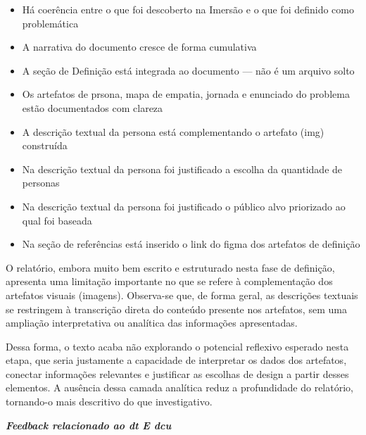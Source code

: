 \documentclass[
  sigconf,
  nonacm, %
  language=portuguese
]{acmart}
\begin{document}
\begin{itemize}[leftmargin=14pt,itemsep=1pt,topsep=3pt,parsep=0pt]
  \item[\textcolor{cgood}{$\checkmark$}] {\small\textcolor{cgood}{Há coerência entre o que foi descoberto na Imersão e o que foi definido como problemática}}
  \item[\textcolor{cgood}{$\checkmark$}] {\small\textcolor{cgood}{A narrativa do documento cresce de forma cumulativa}}
  \item[\textcolor{cgood}{$\checkmark$}] {\small\textcolor{cgood}{A seção de Definição está integrada ao documento — não é um arquivo solto}}
  \item[\textcolor{cgood}{$\checkmark$}] {\small\textcolor{cgood}{Os artefatos de prsona, mapa de empatia, jornada e enunciado do problema estão documentados com clareza}}
  \item[\textcolor{cgood}{$\checkmark$}] {\small\textcolor{cgood}{A descrição textual da persona está complementando o artefato (img) construída}}
  \item[\textcolor{cgood}{$\checkmark$}] {\small\textcolor{cgood}{Na descrição textual da persona foi justificado a escolha da quantidade de personas}}
  \item[\textcolor{cgood}{$\checkmark$}] {\small\textcolor{cgood}{Na descrição textual da persona foi justificado o público alvo priorizado ao qual foi baseada}}
  \item[\textcolor{cgood}{$\checkmark$}] {\small\textcolor{cgood}{Na seção de referências está inserido o link do figma dos artefatos de definição}}
\end{itemize}

O relatório, embora muito bem escrito e estruturado nesta fase de definição, apresenta uma limitação importante no que se refere à complementação dos artefatos visuais (imagens). Observa-se que, de forma geral, as descrições textuais se restringem à transcrição direta do conteúdo presente nos artefatos, sem uma ampliação interpretativa ou analítica das informações apresentadas.

Dessa forma, o texto acaba não explorando o potencial reflexivo esperado nesta etapa, que seria justamente a capacidade de interpretar os dados dos artefatos, conectar informações relevantes e justificar as escolhas de design a partir desses elementos. A ausência dessa camada analítica reduz a profundidade do relatório, tornando-o mais descritivo do que investigativo.

\textit{\textbf{Feedback relacionado ao dt E dcu}}
\end{document}
